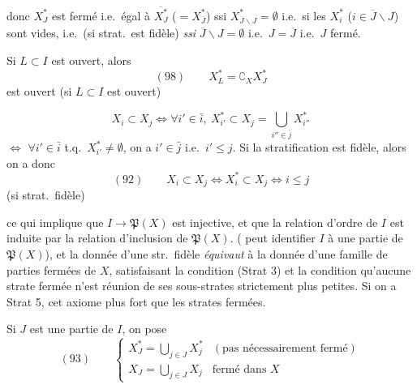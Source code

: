 \documentclass[11pt,a4paper]{article}
\begin{document}
donc  $X^{*}_J$ est fermé i.e.\ égal à $\overline{X^{*}_J}$ ($=X^{*}_{\overline J}$) ssi $X^{*}_{\overline J\smallsetminus J}=\emptyset$ i.e.\ si les $X_i^{*}$ ($i\in\overline J\smallsetminus J$) sont vides, i.e.\ (si strat.\ est fidèle) \emph{ssi} $\overline J\smallsetminus J=\emptyset$ i.e.\ $J=\overline J$ i.e.\ $J$ fermé.

Si $L\subset I$ est ouvert,  alors
\[
(98)\qquad X^{*}_L=\complement_X X^{*}_J
\]
est ouvert (si $L\subset I$ est ouvert)


\[
X_i\subset X_j\iff\forall i'\in\bar i,\ X^{*}_{i'}\subset X_j=\bigcup_{i''\in\bar j}X^{*}_{i''}
\]
$\iff$ $\forall i'\in\bar i$ t.q.\ $X^{*}_{i'}\ne\emptyset$, on a $i'\in\bar j$ i.e.\ $i'\le j$.
Si la stratification est fidèle, alors on a donc
\[
(92)\qquad X_i\subset X_j\iff X_i^{*}\subset X_j\iff i\le j
\]
(si strat.\ fidèle)

ce qui implique que $I\to\mathfrak P(X)$ est injective, et que la relation d'ordre de $I$ est induite par la relation d'inclusion de $\mathfrak P(X)$. (\ill{} \ill{} peut identifier $I$ à une partie de $\mathfrak P(X)$), et la donnée d'une str.\ fidèle \emph{équivaut} à la donnée d'une \struck{\ill{}} famille  de parties fermées  de $X$,  satisfaisant la condition (Strat 3)  et la condition qu'aucune strate fermée n'est réunion de ses sous-strates strictement plus petites. Si on a Strat 5, cet \struck{\ill{}} axiome \ill{} plus fort que \ill{} les strates fermées.

Si $J$ est une partie de $I$, on pose
\[
(93)\qquad
\begin{cases}
X^{*}_J=\bigcup_{j\in J}X^{*}_j & (\text{pas nécessairement fermé})\\
X_J=\bigcup_{j\in J}X_j & \text{fermé dans } X
\end{cases}
\]
\end{document}
